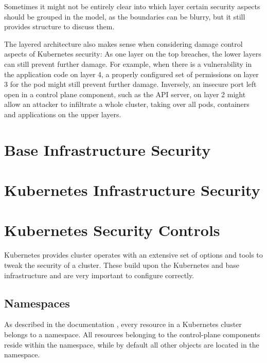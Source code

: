 Sometimes it might not be entirely clear into which layer certain security aspects should be grouped in the model, as the boundaries can be blurry, but it still provides structure to discuss them.

The layered architecture also makes sense when considering damage control aspects of Kubernetes security: As one layer on the top breaches, the lower layers can still prevent further damage. For example, when there is a vulnerability in the application code on layer 4, a properly configured set of permissions on layer 3 for the pod might still prevent further damage. Inversely, an insecure port left open in a control plane component, such as the API server, on layer 2 might allow an attacker to infiltrate a whole cluster, taking over all pods, containers and applications on the upper layers. 
	
\section{Base Infrastructure Security} \label{sec:layer1}


\section{Kubernetes Infrastructure Security} \label{sec:layer2}



\section{Kubernetes Security Controls} \label{sec:layer3}

Kubernetes provides cluster operates with an extensive set of options and tools to tweak the security of a cluster. These build upon the Kubernetes and base infrastructure and are very important to configure correctly. 


\subsection{Namespaces} \label{sec:namespaces}

As described in the documentation \cite{k8sdocsNamespaces}, every resource in a Kubernetes cluster belongs to a namespace. All resources belonging to the control-plane components reside within the  namespace, while by default all other objects are located in the  namespace. 

